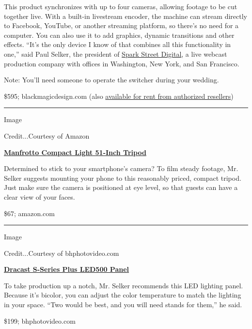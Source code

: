 This product synchronizes with up to four cameras, allowing footage to
be cut together live. With a built-in livestream encoder, the machine
can stream directly to Facebook, YouTube, or another streaming platform,
so there's no need for a computer. You can also use it to add graphics,
dynamic transitions and other effects. ``It's the only device I know of
that combines all this functionality in one,'' said Paul Selker, the
president of \href{https://sparkstreetdigital.com/}{Spark Street
Digital}, a live webcast production company with offices in Washington,
New York, and San Francisco.

Note: You'll need someone to operate the switcher during your wedding.

\$595; blackmagicdesign.com (also
\href{https://www.blackmagicdesign.com/products/atemmini/howtobuy/}{available
for rent from authorized resellers})

\begin{center}\rule{0.5\linewidth}{\linethickness}\end{center}

Image

Credit...Courtesy of Amazon

\textbf{\href{https://www.amazon.com/dp/B07JN5Q1D3/ref=twister_B07PW2QDF8}{Manfrotto
Compact Light 51-Inch Tripod}}

Determined to stick to your smartphone's camera? To film steady footage,
Mr. Selker suggests mounting your phone to this reasonably priced,
compact tripod. Just make sure the camera is positioned at eye level, so
that guests can have a clear view of your faces.

\$67; amazon.com

\begin{center}\rule{0.5\linewidth}{\linethickness}\end{center}

Image

Credit...Courtesy of bhphotovideo.com

\textbf{\href{https://www.bhphotovideo.com/c/product/1367520-REG/dracast_drsppl500bn_s_series_led500_plus.html}{Dracast
S-Series Plus LED500 Panel}}

To take production up a notch, Mr. Selker recommends this LED lighting
panel. Because it's bicolor, you can adjust the color temperature to
match the lighting in your space. ``Two would be best, and you will need
stands for them,'' he said.

\$199; bhphotovideo.com

